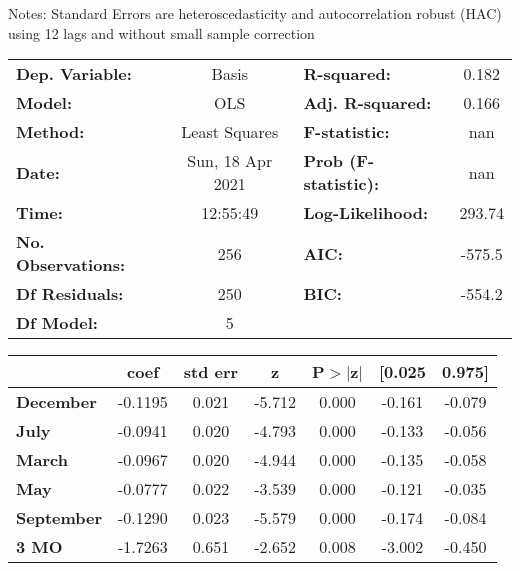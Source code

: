 Notes: \newline
 [1] Standard Errors are heteroscedasticity and autocorrelation robust (HAC) using 12 lags and without small sample correction
\begin{center}
\begin{tabular}{lclc}
\toprule
\textbf{Dep. Variable:}    &      Basis       & \textbf{  R-squared:         } &     0.182   \\
\textbf{Model:}            &       OLS        & \textbf{  Adj. R-squared:    } &     0.166   \\
\textbf{Method:}           &  Least Squares   & \textbf{  F-statistic:       } &       nan   \\
\textbf{Date:}             & Sun, 18 Apr 2021 & \textbf{  Prob (F-statistic):} &      nan    \\
\textbf{Time:}             &     12:55:49     & \textbf{  Log-Likelihood:    } &    293.74   \\
\textbf{No. Observations:} &         256      & \textbf{  AIC:               } &    -575.5   \\
\textbf{Df Residuals:}     &         250      & \textbf{  BIC:               } &    -554.2   \\
\textbf{Df Model:}         &           5      & \textbf{                     } &             \\
\bottomrule
\end{tabular}
\begin{tabular}{lcccccc}
                   & \textbf{coef} & \textbf{std err} & \textbf{z} & \textbf{P$> |$z$|$} & \textbf{[0.025} & \textbf{0.975]}  \\
\midrule
\textbf{December}  &      -0.1195  &        0.021     &    -5.712  &         0.000        &       -0.161    &       -0.079     \\
\textbf{July}      &      -0.0941  &        0.020     &    -4.793  &         0.000        &       -0.133    &       -0.056     \\
\textbf{March}     &      -0.0967  &        0.020     &    -4.944  &         0.000        &       -0.135    &       -0.058     \\
\textbf{May}       &      -0.0777  &        0.022     &    -3.539  &         0.000        &       -0.121    &       -0.035     \\
\textbf{September} &      -0.1290  &        0.023     &    -5.579  &         0.000        &       -0.174    &       -0.084     \\
\textbf{3 MO}      &      -1.7263  &        0.651     &    -2.652  &         0.008        &       -3.002    &       -0.450     \\

\end{tabular}
\end{center}
